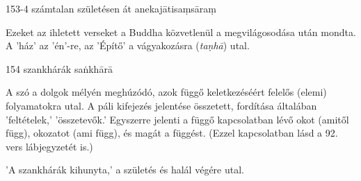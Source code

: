 
\begin{notesdescription}

\item[{153-4}
{számtalan születésen át}
{anekajātisaṃsāraṃ}] \hfill\par

Ezeket az ihletett verseket a Buddha közvetlenül a megvilágosodása után mondta. A 'ház' az 'én'-re, az 'Építő' a vágyakozásra (\textit{taṇhā}) utal.

\item[{154}
{szankhárák}
{saṅkhārā}] \hfill\par

A szó a dolgok mélyén meghúzódó, azok függő keletkezéséért felelős (elemi) folyamatokra utal. A páli kifejezés jelentése összetett, fordítása általában 'feltételek,' 'összetevők.' Egyszerre jelenti a függő kapcsolatban lévő okot (amitől függ), okozatot (ami függ), és magát a függést. (Ezzel kapcsolatban lásd a 92. vers lábjegyzetét is.)

'A szankhárák kihunyta,' a születés és halál végére utal.

\end{notesdescription}

